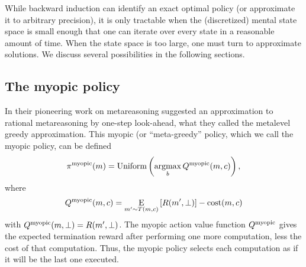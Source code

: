 


\separator

While backward induction can identify an exact optimal policy (or approximate it to arbitrary precision), it is only tractable when the (discretized) mental state space is small enough that one can iterate over every state in a reasonable amount of time. When the state space is too large, one must turn to approximate solutions. We discuss several possibilities in the following sections.

\subsection{The myopic policy}\label{sec:myopic}

In their pioneering work on metareasoning \citet{russell1991principles} suggested an approximation to rational metareasoning by one-step look-ahead, what they called the metalevel greedy approximation. This myopic (or ``meta-greedy'' policy, which we call the myopic policy, can be defined
\begin{equation}
  \pi^{\mathrm{myopic}}(m) = \mathrm{Uniform}\left(\operatorname*{argmax}_b Q^{\mathrm{myopic}}(m, c)\right),
\end{equation}
where
\begin{equation}\label{eq:Q-myopic}
Q^{\mathrm{myopic}}(m, c) = \operatorname*{E}_{m' \sim T(m, c)}\left[ 
  R(m', \bot)
\right] - \text{cost}(m, c)
\end{equation}
with $Q^{\mathrm{myopic}}(m, \bot) = R(m', \bot)$. The myopic action value function $Q^{\mathrm{myopic}}$ gives the expected termination reward after performing one more computation, less the cost of that computation. Thus, the myopic policy selects each computation as if it will be the last one executed.

